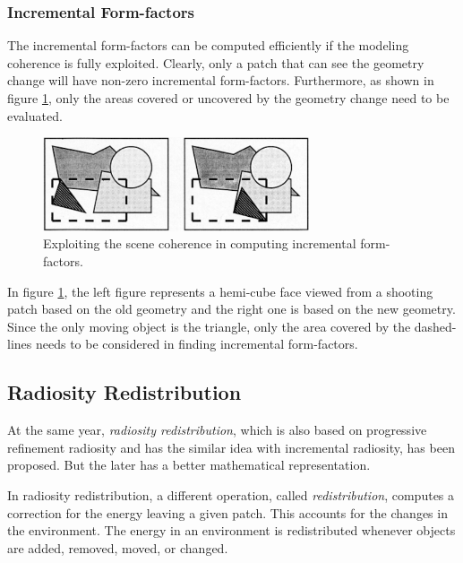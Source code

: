 \subsubsection{Incremental Form-factors}
The incremental form-factors can be computed efficiently if the modeling coherence is fully exploited. Clearly, only a patch that can see the geometry change will have non-zero incremental form-factors. Furthermore, as shown in figure \ref{f:incremental-form-factors}, only the areas covered or uncovered by the geometry change need to be evaluated.

\begin{figure}\label{f:incremental-form-factors}
	\begin{center}
		\includegraphics[width=0.7\textwidth]{graphics/gi/path-37}
	\end{center}
	\caption{Exploiting the scene coherence in computing incremental form-factors.}
\end{figure}

In figure \ref{f:incremental-form-factors}, the left figure represents a hemi-cube face viewed from a shooting patch based on the old geometry and the right one is based on the new geometry. Since the only moving object is the triangle, only the area covered by the dashed-lines needs to be considered in
finding incremental form-factors.




\subsection{Radiosity Redistribution}
At the same year, \textit{radiosity redistribution}\cite{a:RadiosityRedistributionforDynamicEnvironments}, which is also based on progressive refinement radiosity and has the similar idea with incremental radiosity, has been proposed. But the later has a better mathematical representation. 

In radiosity redistribution, a different operation, called \textit{redistribution}, computes a correction for the energy leaving a given patch. This accounts for the changes in the environment. The energy in an environment is redistributed whenever objects are added, removed, moved, or changed.



